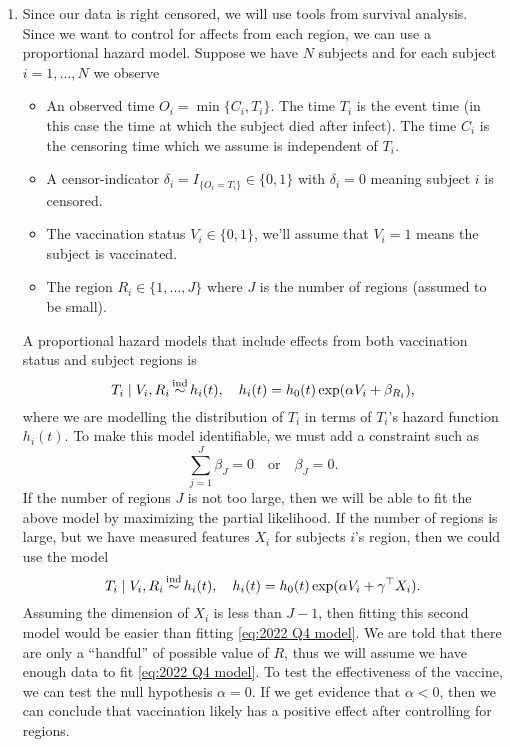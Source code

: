\begin{enumerate}[label=(\alph*)]
    \item Since our data is right censored, we will use tools from survival analysis.  Since we want to control for affects from each region, we can use a proportional hazard model. Suppose we have $N$ subjects and for each subject $i=1,\ldots,N$ we observe 
    \begin{itemize}
        \item An observed time $O_i = \min\{C_i,T_i\}$. The time $T_i$ is the event time (in this case the time at which the subject died after infect). The time $C_i$ is the censoring time which we assume is independent of $T_i$.
        \item A censor-indicator $\delta_i= I_{\{O_i = T_i\}} \in \{0,1\}$ with $\delta_i=0$ meaning subject $i$ is censored.
        \item The vaccination status $V_i \in \{0,1\}$, we'll assume that $V_i=1$ means the subject is vaccinated.
        \item The region $R_i \in \{1,\ldots,J\}$ where $J$ is the number of regions (assumed to be small).
    \end{itemize}
    A proportional hazard models that include effects from both vaccination status and subject regions is
    \begin{equation}\label{eq:2022 Q4 model}T_i\mid V_i,R_i \simind h_i(t), \quad h_i(t) = h_0(t)\exp(\alpha V_i + \beta_{R_i}), \end{equation}
    where we are modelling the distribution of $T_i$ in terms of $T_i$'s hazard function $h_i(t)$. To make this model identifiable, we must add a constraint such as
    \[\sum_{j=1}^J \beta_J = 0 \quad \text{or} \quad \beta_J = 0. \]
    If the number of regions $J$ is not too large, then we will be able to fit the above model by maximizing the partial likelihood. If the number of regions is large, but we have measured features $X_i$ for subjects $i$'s region, then we could use the model
    \[T_i \mid V_i,R_i \simind h_i(t), \quad h_i(t)=h_0(t)\exp(\alpha V_i + \gamma^\top X_i). \]
    Assuming the dimension of $X_i$ is less than $J-1$, then fitting this second model would be easier than fitting \eqref{eq:2022 Q4 model}. We are told that there are only a ``handful'' of possible value of $R$, thus we will assume we have enough data to fit \eqref{eq:2022 Q4 model}. To test the effectiveness of the vaccine, we can test the null hypothesis $\alpha = 0$. If we get evidence that $\alpha <0$, then we can conclude that vaccination likely has a positive effect after controlling for regions. 


\end{enumerate}
